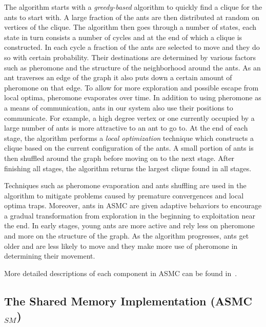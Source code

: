 \documentclass[11pt]{article}
\begin{document}
The algorithm starts with a \textit{greedy-based} algorithm to quickly find a clique for the ants to start with.  A large fraction of the ants are then distributed at random on vertices of the clique.  The algorithm then goes through a number of states, each state in turn consists a number of cycles and at the end of which a clique is constructed. In each cycle a fraction of the ants are selected to move and they do so with certain probability.  Their destinations are determined by various factors such as pheromone and the structure of the neighborhood around the ants.  As an ant traverses an edge of the graph it also puts down a certain amount of pheromone on that edge.  To allow for more exploration and possible escape from local optima, pheromone evaporates over time.  In addition to using pheromone as a means of communication, ants in our system also use their positions to communicate.  For example, a high degree vertex or one currently occupied by a large number of ants is more attractive to an ant to go to. At the end of each stage, the algorithm performs a \textit{local optimization} technique which constructs a clique based on the current configuration of the ants. A small portion of ants is then shuffled around the graph before moving on to the next stage. After finishing all stages, the algorithm returns the largest clique found in all stages. %


Techniques such as pheromone evaporation and ants shuffling are used in the algorithm to mitigate problems caused by premature convergences and local optima traps. Moreover, ants in ASMC are given adaptive behaviors to encourage a gradual transformation from exploration in the beginning to exploitation near the end. In early stages, young ants are more active and rely less on pheromone and more on the structure of the graph.  As the algorithm progresses, ants get older and are less likely to move and they make more use of pheromone in determining their movement.

More detailed descriptions of each component in ASMC can be found in~\cite{BR}.

\subsection{The Shared Memory Implementation (ASMC$_{SM}$)}\label{ASMC_sm}
\end{document}
